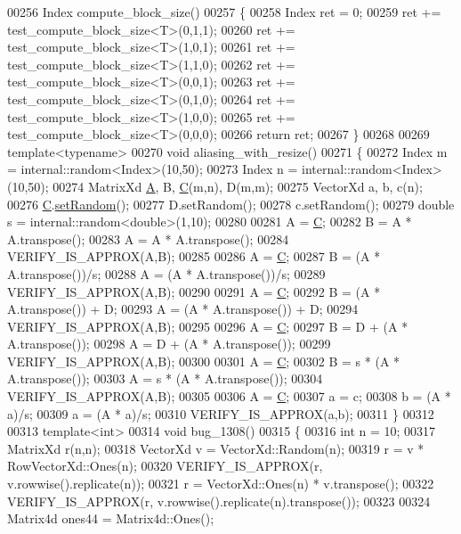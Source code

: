\begin{DoxyCode}
00256 Index compute\_block\_size()
00257 \{
00258   Index ret = 0;
00259   ret += test\_compute\_block\_size<T>(0,1,1);
00260   ret += test\_compute\_block\_size<T>(1,0,1);
00261   ret += test\_compute\_block\_size<T>(1,1,0);
00262   ret += test\_compute\_block\_size<T>(0,0,1);
00263   ret += test\_compute\_block\_size<T>(0,1,0);
00264   ret += test\_compute\_block\_size<T>(1,0,0);
00265   ret += test\_compute\_block\_size<T>(0,0,0);
00266   \textcolor{keywordflow}{return} ret;
00267 \}
00268 
00269 \textcolor{keyword}{template}<\textcolor{keyword}{typename}>
00270 \textcolor{keywordtype}{void} aliasing\_with\_resize()
00271 \{
00272   Index m = internal::random<Index>(10,50);
00273   Index n = internal::random<Index>(10,50);
00274   MatrixXd \hyperlink{group___core___module_class_eigen_1_1_matrix}{A}, B, \hyperlink{group___core___module}{C}(m,n), D(m,m);
00275   VectorXd a, b, c(n);
00276   \hyperlink{group___core___module}{C}.\hyperlink{class_eigen_1_1_plain_object_base_af0e576a0e1aefc9ee346de44cc352ba3}{setRandom}();
00277   D.setRandom();
00278   c.setRandom();
00279   \textcolor{keywordtype}{double} s = internal::random<double>(1,10);
00280 
00281   A = \hyperlink{group___core___module}{C};
00282   B = A * A.transpose();
00283   A = A * A.transpose();
00284   VERIFY\_IS\_APPROX(A,B);
00285 
00286   A = \hyperlink{group___core___module}{C};
00287   B = (A * A.transpose())/s;
00288   A = (A * A.transpose())/s;
00289   VERIFY\_IS\_APPROX(A,B);
00290 
00291   A = \hyperlink{group___core___module}{C};
00292   B = (A * A.transpose()) + D;
00293   A = (A * A.transpose()) + D;
00294   VERIFY\_IS\_APPROX(A,B);
00295 
00296   A = \hyperlink{group___core___module}{C};
00297   B = D + (A * A.transpose());
00298   A = D + (A * A.transpose());
00299   VERIFY\_IS\_APPROX(A,B);
00300 
00301   A = \hyperlink{group___core___module}{C};
00302   B = s * (A * A.transpose());
00303   A = s * (A * A.transpose());
00304   VERIFY\_IS\_APPROX(A,B);
00305 
00306   A = \hyperlink{group___core___module}{C};
00307   a = c;
00308   b = (A * a)/s;
00309   a = (A * a)/s;
00310   VERIFY\_IS\_APPROX(a,b);
00311 \}
00312 
00313 \textcolor{keyword}{template}<\textcolor{keywordtype}{int}>
00314 \textcolor{keywordtype}{void} bug\_1308()
00315 \{
00316   \textcolor{keywordtype}{int} n = 10;
00317   MatrixXd r(n,n);
00318   VectorXd v = VectorXd::Random(n);
00319   r = v * RowVectorXd::Ones(n);
00320   VERIFY\_IS\_APPROX(r, v.rowwise().replicate(n));
00321   r = VectorXd::Ones(n) * v.transpose();
00322   VERIFY\_IS\_APPROX(r, v.rowwise().replicate(n).transpose());
00323 
00324   Matrix4d ones44 = Matrix4d::Ones();

\end{DoxyCode}
